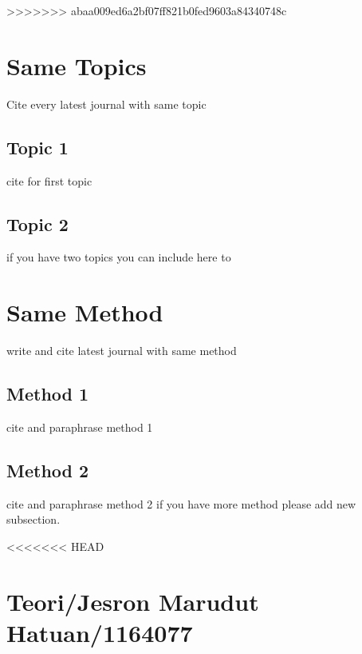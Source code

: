 >>>>>>> abaa009ed6a2bf07ff821b0fed9603a84340748c

\section{Same Topics}
Cite every latest journal with same topic
\subsection{Topic 1}
cite for first topic

\subsection{Topic 2}
if you have two topics you can include here to


\section{Same Method}
write and cite latest journal with same method

\subsection{Method 1}
cite and paraphrase method 1

\subsection{Method 2}
cite and paraphrase method 2 if you have more method please add new subsection.

<<<<<<< HEAD
\section{Teori/Jesron Marudut Hatuan/1164077}
